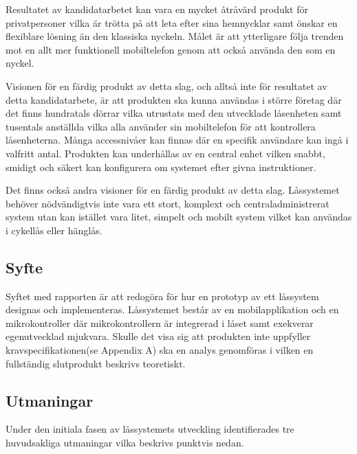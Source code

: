 \documentclass[11pt]{article}
\begin{document}
Resultatet av kandidatarbetet kan vara en mycket åtråvärd produkt för privatpersoner vilka är trötta på att leta efter sina hemnycklar samt önskar en flexiblare lösning än den klassiska nyckeln. Målet är att ytterligare följa trenden mot en allt mer funktionell mobiltelefon genom att också använda den som en nyckel.

Visionen för en färdig produkt av detta slag, och alltså inte för resultatet av detta kandidatarbete, är att produkten ska kunna användas i större företag där det finns hundratals dörrar vilka utrustats med den utvecklade låsenheten samt tusentals anställda vilka alla använder sin mobiltelefon för att kontrollera låsenheterna. Många accessnivåer kan finnas där en specifik användare kan ingå i valfritt antal. Produkten kan underhållas av en central enhet vilken snabbt, smidigt och säkert kan konfigurera om systemet efter givna instruktioner.

Det finns också andra visioner för en färdig produkt av detta slag. Låssystemet behöver nödvändigtvis inte vara ett stort, komplext och centraladministrerat system utan kan istället vara litet, simpelt och mobilt system vilket kan användas i cykellås eller hänglås. 


\subsection{Syfte}
\label{Syfte}
Syftet med rapporten är att redogöra för hur en prototyp av ett låssystem designas och implementeras. Låssystemet består av en mobilapplikation och en mikrokontroller där mikrokontrollern är integrerad i låset samt exekverar egenutvecklad mjukvara. Skulle det visa sig att produkten inte uppfyller kravspecifikationen(se Appendix A) ska en analys genomföras i vilken en fullständig slutprodukt beskrivs teoretiskt.


\subsection{Utmaningar}
\label{Utmaningar}
Under den initiala fasen av låssystemets utveckling identifierades tre huvudsakliga utmaningar vilka beskrivs punktvis nedan.
\end{document}
